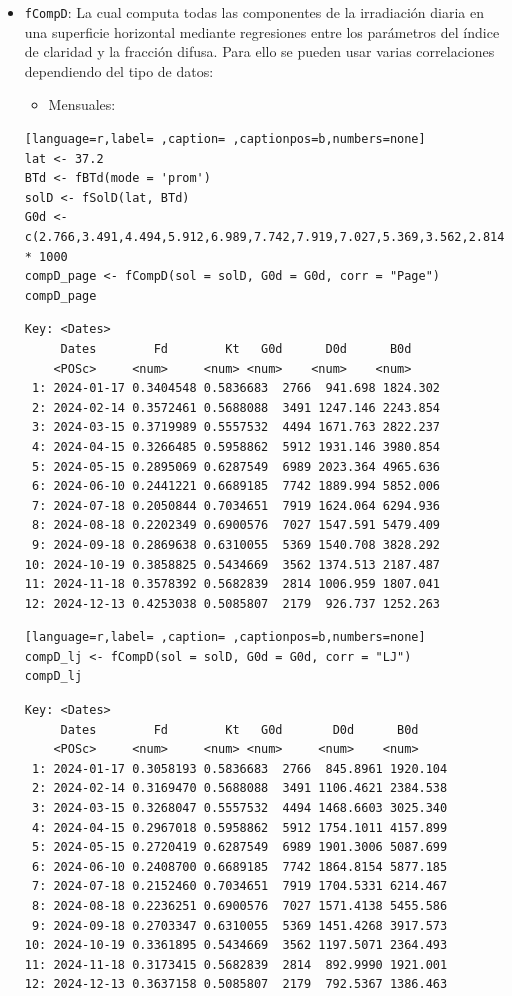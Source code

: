 \begin{itemize}
\item \texttt{fCompD}: La cual computa todas las componentes de la irradiación diaria en una superficie horizontal mediante regresiones entre los parámetros del índice de claridad y la fracción difusa.
Para ello se pueden usar varias correlaciones dependiendo del tipo de datos:
\begin{itemize}
\item Mensuales:
\end{itemize}
\begin{lstlisting}[language=r,label= ,caption= ,captionpos=b,numbers=none]
lat <- 37.2
BTd <- fBTd(mode = 'prom')
solD <- fSolD(lat, BTd)
G0d <- c(2.766,3.491,4.494,5.912,6.989,7.742,7.919,7.027,5.369,3.562,2.814,2.179) * 1000
compD_page <- fCompD(sol = solD, G0d = G0d, corr = "Page")
compD_page
\end{lstlisting}

\begin{verbatim}
Key: <Dates>
	 Dates        Fd        Kt   G0d      D0d      B0d
	<POSc>     <num>     <num> <num>    <num>    <num>
 1: 2024-01-17 0.3404548 0.5836683  2766  941.698 1824.302
 2: 2024-02-14 0.3572461 0.5688088  3491 1247.146 2243.854
 3: 2024-03-15 0.3719989 0.5557532  4494 1671.763 2822.237
 4: 2024-04-15 0.3266485 0.5958862  5912 1931.146 3980.854
 5: 2024-05-15 0.2895069 0.6287549  6989 2023.364 4965.636
 6: 2024-06-10 0.2441221 0.6689185  7742 1889.994 5852.006
 7: 2024-07-18 0.2050844 0.7034651  7919 1624.064 6294.936
 8: 2024-08-18 0.2202349 0.6900576  7027 1547.591 5479.409
 9: 2024-09-18 0.2869638 0.6310055  5369 1540.708 3828.292
10: 2024-10-19 0.3858825 0.5434669  3562 1374.513 2187.487
11: 2024-11-18 0.3578392 0.5682839  2814 1006.959 1807.041
12: 2024-12-13 0.4253038 0.5085807  2179  926.737 1252.263
\end{verbatim}

\begin{lstlisting}[language=r,label= ,caption= ,captionpos=b,numbers=none]
compD_lj <- fCompD(sol = solD, G0d = G0d, corr = "LJ")
compD_lj
\end{lstlisting}

\begin{verbatim}
Key: <Dates>
	 Dates        Fd        Kt   G0d       D0d      B0d
	<POSc>     <num>     <num> <num>     <num>    <num>
 1: 2024-01-17 0.3058193 0.5836683  2766  845.8961 1920.104
 2: 2024-02-14 0.3169470 0.5688088  3491 1106.4621 2384.538
 3: 2024-03-15 0.3268047 0.5557532  4494 1468.6603 3025.340
 4: 2024-04-15 0.2967018 0.5958862  5912 1754.1011 4157.899
 5: 2024-05-15 0.2720419 0.6287549  6989 1901.3006 5087.699
 6: 2024-06-10 0.2408700 0.6689185  7742 1864.8154 5877.185
 7: 2024-07-18 0.2152460 0.7034651  7919 1704.5331 6214.467
 8: 2024-08-18 0.2236251 0.6900576  7027 1571.4138 5455.586
 9: 2024-09-18 0.2703347 0.6310055  5369 1451.4268 3917.573
10: 2024-10-19 0.3361895 0.5434669  3562 1197.5071 2364.493
11: 2024-11-18 0.3173415 0.5682839  2814  892.9990 1921.001
12: 2024-12-13 0.3637158 0.5085807  2179  792.5367 1386.463
\end{verbatim}


\end{itemize}
